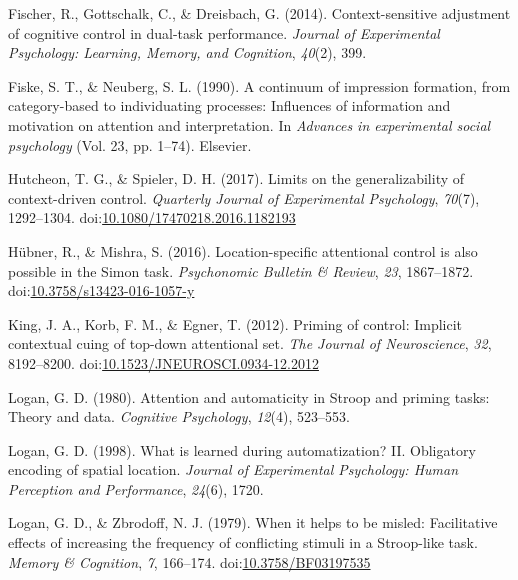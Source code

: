 \documentclass[english,,man,floatsintext]{apa6}
\begin{document}
\leavevmode\hypertarget{ref-fischer_context-sensitive_2014}{}%
Fischer, R., Gottschalk, C., \& Dreisbach, G. (2014). Context-sensitive adjustment of cognitive control in dual-task performance. \emph{Journal of Experimental Psychology: Learning, Memory, and Cognition}, \emph{40}(2), 399.

\leavevmode\hypertarget{ref-fiske_continuum_1990}{}%
Fiske, S. T., \& Neuberg, S. L. (1990). A continuum of impression formation, from category-based to individuating processes: Influences of information and motivation on attention and interpretation. In \emph{Advances in experimental social psychology} (Vol. 23, pp. 1--74). Elsevier.

\leavevmode\hypertarget{ref-hutcheon_limits_2017}{}%
Hutcheon, T. G., \& Spieler, D. H. (2017). Limits on the generalizability of context-driven control. \emph{Quarterly Journal of Experimental Psychology}, \emph{70}(7), 1292--1304. doi:\href{https://doi.org/10.1080/17470218.2016.1182193}{10.1080/17470218.2016.1182193}

\leavevmode\hypertarget{ref-hubner_location-specific_2016}{}%
Hübner, R., \& Mishra, S. (2016). Location-specific attentional control is also possible in the Simon task. \emph{Psychonomic Bulletin \& Review}, \emph{23}, 1867--1872. doi:\href{https://doi.org/10.3758/s13423-016-1057-y}{10.3758/s13423-016-1057-y}

\leavevmode\hypertarget{ref-king_priming_2012}{}%
King, J. A., Korb, F. M., \& Egner, T. (2012). Priming of control: Implicit contextual cuing of top-down attentional set. \emph{The Journal of Neuroscience}, \emph{32}, 8192--8200. doi:\href{https://doi.org/10.1523/JNEUROSCI.0934-12.2012}{10.1523/JNEUROSCI.0934-12.2012}

\leavevmode\hypertarget{ref-logan_attention_1980}{}%
Logan, G. D. (1980). Attention and automaticity in Stroop and priming tasks: Theory and data. \emph{Cognitive Psychology}, \emph{12}(4), 523--553.

\leavevmode\hypertarget{ref-logan_what_1998}{}%
Logan, G. D. (1998). What is learned during automatization? II. Obligatory encoding of spatial location. \emph{Journal of Experimental Psychology: Human Perception and Performance}, \emph{24}(6), 1720.

\leavevmode\hypertarget{ref-logan_when_1979}{}%
Logan, G. D., \& Zbrodoff, N. J. (1979). When it helps to be misled: Facilitative effects of increasing the frequency of conflicting stimuli in a Stroop-like task. \emph{Memory \& Cognition}, \emph{7}, 166--174. doi:\href{https://doi.org/10.3758/BF03197535}{10.3758/BF03197535}
\end{document}
